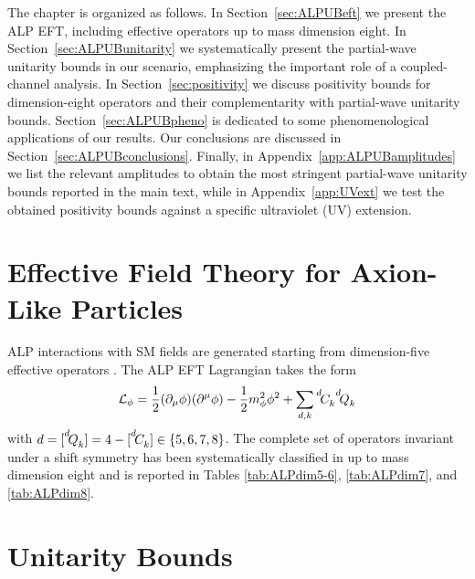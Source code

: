 The chapter is organized as follows. In Section~\ref{sec:ALPUBeft} we present the ALP EFT, including
effective operators up to mass dimension eight. In Section~\ref{sec:ALPUBunitarity} we systematically
present the partial-wave unitarity bounds in our scenario, emphasizing the important role of a
coupled-channel analysis. In Section~\ref{sec:positivity} we discuss positivity bounds for
dimension-eight operators and their complementarity with partial-wave unitarity bounds.
Section~\ref{sec:ALPUBpheno} is dedicated to some phenomenological applications of our results. Our
conclusions are discussed in Section~\ref{sec:ALPUBconclusions}. Finally, in
Appendix~\ref{app:ALPUBamplitudes} we list the relevant amplitudes to obtain the most stringent
partial-wave unitarity bounds reported in the main text, while in Appendix~\ref{app:UVext} we test
the obtained positivity bounds against a specific ultraviolet (UV) extension.

\section{Effective Field Theory for Axion-Like Particles\label{sec:ALPUBeft}}

ALP interactions with SM fields 
are generated starting from dimension-five effective operators \cite{Georgi:1986df}.
The ALP EFT Lagrangian takes the form
\begin{equation}
    \mathcal L_{\phi} = \frac{1}{2}(\partial_\mu \phi) (\partial^\mu \phi) - \frac{1}{2}m_\phi^2 \phi^2 + \sum_{d,k}\coef{d}{k}{}\op{d}{k}{}
\end{equation}
with $d = [\op{d}{k}{}] = 4- [\coef{d}{k}{}]\in\{5,6,7,8\}$.
%
The complete set of operators invariant under a shift symmetry has been systematically classified in \cite{Song:2023lxf,Grojean:2023tsd,Bertuzzo:2023slg} up to mass dimension eight and is reported in Tables \ref{tab:ALPdim5-6}, \ref{tab:ALPdim7}, and \ref{tab:ALPdim8}.





\section{Unitarity Bounds\label{sec:ALPUBunitarity}}

